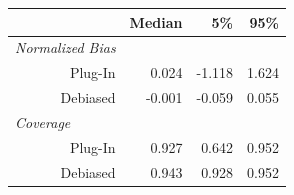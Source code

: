 
\begin{tabular}{r|rrr}
\toprule
  & Median & 5\% & 95\%\\
\midrule
\multicolumn{1}{l|}{\textit{Normalized Bias}}\\
Plug-In & 0.024 & -1.118 & 1.624\\
Debiased & -0.001 & -0.059 & 0.055\\
\midrule
\multicolumn{1}{l|}{\textit{Coverage}}\\
Plug-In & 0.927 & 0.642 & 0.952\\
Debiased & 0.943 & 0.928 & 0.952\\
\bottomrule
\end{tabular}
